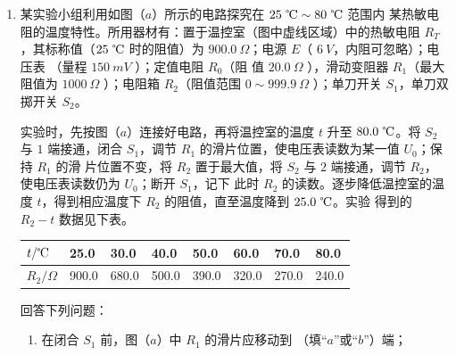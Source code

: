 \begin{enumerate}
\item 
{}
某实验小组利用如图（$ a $）所示的电路探究在 $ 25 \ \celsius \sim 80 \ \celsius $ 范围内
某热敏电阻的温度特性。所用器材有：置于温控室（图中虚线区域）中的热敏电阻 $ R_T $，其标称值（$ 25 \ \celsius $
时的阻值）为 $ 900.0 \ \Omega $；电源 $ E $（ $ 6 \ V $，内阻可忽略）；电压表 \voltmetermytikz 
（量程 $ 150 \ m V $ ）；定值电阻 $ R_{0} $（阻
值 $ 20.0 \ \Omega $ ），滑动变阻器 $ R_{1} $（最大阻值为 $ 1000 \ \Omega $ ）；电阻箱 $ R_{2} $（阻值范围 $ 0 \sim 999.9 \ \Omega $ ）；单刀开关
$ S_{1} $，单刀双掷开关 $ S_{2} $。
\begin{figure}[h!]
\centering
\begin{subfigure}{0.4\linewidth}
\centering
 
\caption{}\label{}
\end{subfigure}
\begin{subfigure}{0.4\linewidth}
\centering
 
\caption{}\label{}
\end{subfigure}
\begin{subfigure}{0.4\linewidth}
\centering
 
\caption{}\label{}
\end{subfigure}
\end{figure}



实验时，先按图（$ a $）连接好电路，再将温控室的温度 $ t $ 升至
$ 80.0 \ \celsius $。将 $ S_{2} $ 与 $ 1 $ 端接通，闭合 $ S_{1} $，调节 $ R_{1} $ 的滑片位置，使电压表读数为某一值 $ U_{0} $；保持 $ R_{1} $ 的滑
片位置不变，将 $ R_{2} $ 置于最大值，将 $ S_{2} $ 与 $ 2 $ 端接通，调节 $ R_{2} $，使电压表读数仍为 $ U_{0} $；断开 $ S_{1} $，记下
此时 $ R_{2} $ 的读数。逐步降低温控室的温度 $ t $，得到相应温度下 $ R_{2} $ 的阻值，直至温度降到 $ 25.0 \ \celsius $。实验
得到的 $ R_{2} -t $ 数据见下表。
\begin{table}[h!]
\centering 
\begin{tabular}{|l|l|l|l|l|l|l|l|}
\hline$t / \celsius $ & 25.0 & 30.0 & 40.0 & 50.0 & 60.0 & 70.0 & 80.0 \\
\hline$R_{2} / \Omega$ & 900.0 & 680.0 & 500.0 & 390.0 & 320.0 & 270.0 & 240.0 \\
\hline
\end{tabular}
\end{table} 


回答下列问题：
\begin{enumerate}
\item
在闭合 $ S_{1} $ 前，图（$ a $）中 $ R_{1} $ 的滑片应移动到
\underlinegap 
（填“$ a $”或“$ b $”）端；


\end{enumerate}
\end{enumerate}
